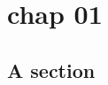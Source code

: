 \documentclass{book}
\begin{document}

\tableofcontents
\clearpage

\chapter{chap 01}
\section{A section}
\lipsum
\end{document}
